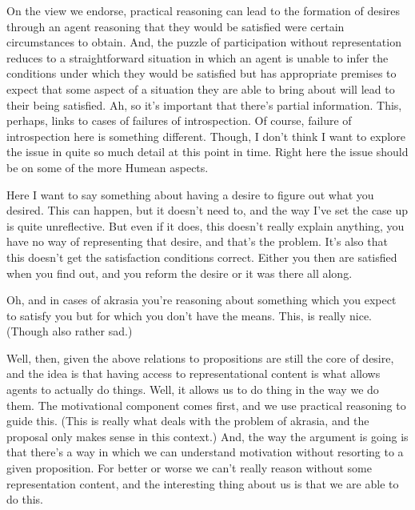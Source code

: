 \documentclass[10pt]{article}
\begin{document}
On the view we endorse, practical reasoning can lead to the formation of desires through an agent reasoning that they would be satisfied were certain circumstances to obtain.
And, the puzzle of participation without representation reduces to a straightforward situation in which an agent is unable to infer the conditions under which they would be satisfied but has appropriate premises to expect that some aspect of a situation they are able to bring about will lead to their being satisfied.
{\color{red}
  Ah, so it's important that there's partial information.
  This, perhaps, links to cases of failures of introspection.
  Of course, failure of introspection here is something different.
  Though, I don't think I want to explore the issue in quite so much detail at this point in time.
  Right here the issue should be on some of the more Humean aspects.
}



{\color{red}
  Here I want to say something about having a desire to figure out what you desired.
  This can happen, but it doesn't need to, and the way I've set the case up is quite unreflective.
  But even if it does, this doesn't really explain anything, you have no way of representing that desire, and that's the problem.
  It's also that this doesn't get the satisfaction conditions correct.
  Either you then are satisfied when you find out, and you reform the desire or it was there all along.
}



{\color{green}
  Oh, and in cases of akrasia you're reasoning about something which you expect to satisfy you but for which you don't have the means.
  This, is really nice.
  (Though also rather sad.)
}

{\color{blue}
  Well, then, given the above relations to propositions are still the core of desire, and the idea is that having access to representational content is what allows agents to actually do things.
  Well, it allows us to do thing in the way we do them.
  The motivational component comes first, and we use practical reasoning to guide this.
  (This is really what deals with the problem of akrasia, and the proposal only makes sense in this context.)
  And, the way the argument is going is that there's a way in which we can understand motivation without resorting to a given proposition.
  For better or worse we can't really reason without some representation content, and the interesting thing about us is that we are able to do this.
  
}
\end{document}
